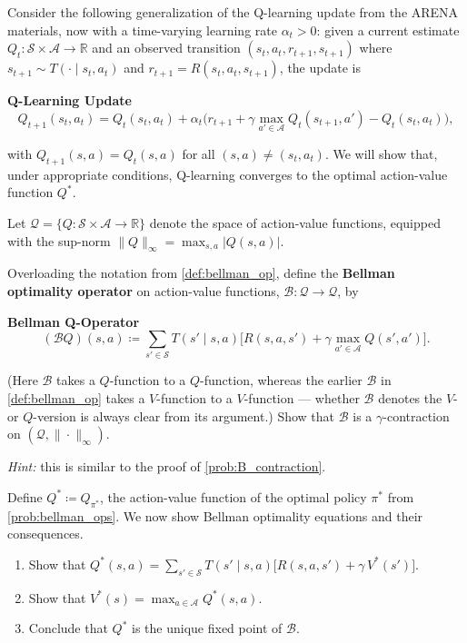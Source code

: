 \documentclass[11pt]{article}
\newcommand{\cS}{\mathcal{S}}
\newcommand{\cA}{\mathcal{A}}
\begin{document}
Consider the following generalization of the Q-learning update from the ARENA materials, now with a time-varying learning rate $\alpha_t > 0$: given a current estimate $Q_t : \cS \times \cA \to \mathbb{R}$ and an observed transition $(s_t, a_t, r_{t+1}, s_{t+1})$ where $s_{t+1} \sim T(\cdot \mid s_t, a_t)$ and $r_{t+1} = R(s_t, a_t, s_{t+1})$, the update is

\begin{callout}[note]
\textbf{Q-Learning Update}
$$
Q_{t+1}(s_t, a_t) = Q_t(s_t, a_t) + \alpha_t\bigl(r_{t+1} + \gamma \max_{a' \in \cA} Q_t(s_{t+1}, a') - Q_t(s_t, a_t)\bigr),
$$
\end{callout}
with $Q_{t+1}(s,a) = Q_t(s,a)$ for all $(s,a) \neq (s_t, a_t)$.
We will show that, under appropriate conditions, Q-learning converges to the optimal action-value function $Q^*$.

Let $\mathcal{Q} = \{Q : \cS \times \cA \to \mathbb{R}\}$ denote the space of action-value functions, equipped with the sup-norm $\|Q\|_\infty = \max_{s,a} |Q(s,a)|$.

\begin{exercise}
\label{prob:BQ_contraction} Overloading the notation from \cref{def:bellman_op}, define the \textbf{Bellman optimality operator} on action-value functions, $\mathcal{B} : \mathcal{Q} \to \mathcal{Q}$, by
\begin{callout}[note]
\textbf{Bellman Q-Operator}
$$
(\mathcal{B}Q)(s,a) \coloneqq \sum_{s' \in \cS} T(s' \mid s, a)\bigl[R(s,a,s') + \gamma \max_{a' \in \cA} Q(s', a')\bigr].
$$
\end{callout}
(Here $\mathcal{B}$ takes a $Q$-function to a $Q$-function, whereas the earlier $\mathcal{B}$ in \cref{def:bellman_op} takes a $V$-function to a $V$-function --- whether $\mathcal{B}$ denotes the $V$- or $Q$-version is always clear from its argument.) Show that $\mathcal{B}$ is a $\gamma$-contraction on $(\mathcal{Q}, \|\cdot\|_\infty)$.

\textit{Hint:} this is similar to the proof of \cref{prob:B_contraction}.
\end{exercise}


\begin{exercise}
\label{prob:bellman_opt_Q} Define $Q^* \coloneqq Q_{\pi^*}$, the action-value function of the optimal policy $\pi^*$ from \cref{prob:bellman_ops}. We now show Bellman optimality equations and their consequences.
\begin{enumerate}
\item\label{prob:Q_star_formula} Show that $Q^*(s,a) = \sum_{s' \in \cS} T(s' \mid s, a)\bigl[R(s,a,s') + \gamma\, V^*(s')\bigr]$.
\item\label{prob:V_star_max_Q} Show that $V^*(s) = \max_{a \in \cA} Q^*(s,a)$.
\item\label{prob:Q_star_fixed_point} Conclude that $Q^*$ is the unique fixed point of $\mathcal{B}$.
\end{enumerate}
\end{exercise}
\end{document}
